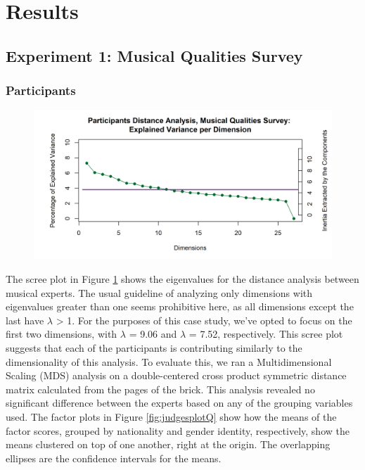 \documentclass[
  english,
  man,floatsintext]{apa6}
\begin{document}
\hypertarget{results}{%
\section{Results}\label{results}}

\hypertarget{experiment-1-musical-qualities-survey}{%
\subsection{Experiment 1: Musical Qualities Survey}\label{experiment-1-musical-qualities-survey}}

\hypertarget{participants-1}{%
\subsubsection{Participants}\label{participants-1}}

\begin{figure}  
  \begin{center}
    \includegraphics{./Music-Descriptor-Space_files/figure-latex/screeRV-1.png}
  \caption{ }\label{fig:screeRVQ}  
 \end{center}
\end{figure}

The scree plot in Figure \ref{fig:screeRVQ} shows the eigenvalues for the distance analysis between musical experts. The usual guideline of analyzing only dimensions with eigenvalues greater than one seems prohibitive here, as all dimensions except the last have \(\lambda\) \textgreater{} 1. For the purposes of this case study, we've opted to focus on the first two dimensions, with \(\lambda\) = 9.06 and \(\lambda\) = 7.52, respectively. This scree plot suggests that each of the participants is contributing similarly to the dimensionality of this analysis. To evaluate this, we ran a Multidimensional Scaling (MDS) analysis on a double-centered cross product symmetric distance matrix calculated from the pages of the brick. This analysis revealed no significant difference between the experts based on any of the grouping variables used. The factor plots in Figure \ref{fig:judgesplotQ} show how the means of the factor scores, grouped by nationality and gender identity, respectively, show the means clustered on top of one another, right at the origin. The overlapping ellipses are the confidence intervals for the means.
\end{document}
